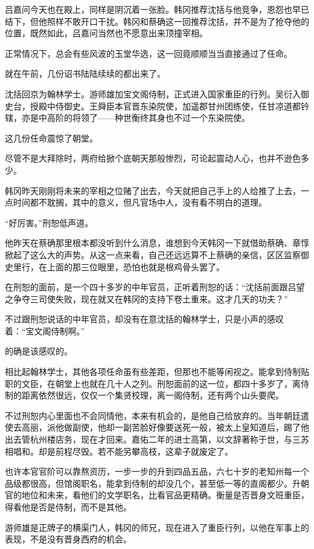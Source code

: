 吕嘉问今天也在殿上，同样是阴沉着一张脸。韩冈推荐沈括与他竞争，恩怨也早已结下，但他照样不敢开口干扰。韩冈和蔡确这一回推荐沈括，并不是为了抢夺他的位置，既然如此，吕嘉问当然也不愿意出来顶撞宰相。

正常情况下，总会有些风波的玉堂华选，这一回竟顺顺当当直接通过了任命。

就在午前，几份诏书陆陆续续的都出来了。

沈括回京为翰林学士。游师雄加宝文阁侍制，正式进入国家重臣的行列。吴衍入御史台，授殿中侍御史。王舜臣本官晋东染院使，加遥郡甘州团练使，任甘凉道都钤辖，亦是中高阶的将领了——种世衡终其身也不过一个东染院使。

这几份任命震惊了朝堂。

尽管不是大拜除时，两府给掀个底朝天那般惨烈，可论起震动人心，也并不逊色多少。

韩冈昨天刚刚将未来的宰相之位赌了出去，今天就把自己手上的人给推了上去，一点时间都不耽搁，其中的意义，但凡官场中人，没有看不明白的道理。

“好厉害。”刑恕低声道。

他昨天在蔡确那里根本都没听到什么消息，谁想到今天韩冈一下就借助蔡确、章惇掀起了这么大的声势。从这一点来看，自己还远远算不上蔡确的亲信，区区监察御史里行，在上面的那三位眼里，恐怕也就是根鸡骨头罢了。

在刑恕的面前，是一个四十多岁的中年官员，正听着刑恕的话：“沈括前面跟吕望之争夺三司使失败，现在就又在韩冈的支持下卷土重来。这才几天的功夫？”

不过跟刑恕说话的中年官员，却没有在意沈括的翰林学士，只是小声的感叹着：“宝文阁侍制啊。”

的确是该感叹的。

相比起翰林学士，其他各项任命虽有些差距，但那也不能等闲视之。能拿到侍制贴职的文臣，在朝堂上也就在几十人之列。刑恕面前的这一位，都四十多岁了，离侍制的距离依然很远，仅仅一个集贤校理，离一阁侍制，还有两个山头要爬。

不过刑恕内心里面也不会同情他，本来有机会的，是他自己给放弃的。当年朝廷遣使去高丽，派他做副使，他却一副苦脸好像要送死一般，被太上皇知道后，踢了他出去管杭州楼店务，现在才回来。嘉佑二年的进士高第，以文辞著称于世，与三苏相唱和。却是前程尽毁。若不能另攀高枝，这辈子就废定了。

也许本官官阶可以靠熬资历，一步一步的升到四品五品，六七十岁的老知州每一个品级都很高，但馆阁职名，能拿到侍制的却没几个，甚至低一等的直阁都少。升朝官的地位和未来，看他们的文学职名，比看官品更精确。衡量是否晋身文班重臣，得看他是否是侍制，而不是其他。

游师雄是正牌子的横渠门人，韩冈的师兄，现在进入了重臣行列，以他在军事上的表现，不是没有晋身西府的机会。

